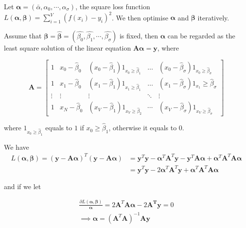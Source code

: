 Let $\boldsymbol{\alpha}=(\bar{\alpha},\alpha_0,\cdots,\alpha_\sigma)$, the square loss function $L(\boldsymbol{\alpha},\boldsymbol{\beta})=\sum_{i=1}^{V}(f(x_i)-y_i)^2$. We then optimise $\boldsymbol{\alpha}$ and $\boldsymbol{\beta}$ iteratively.

Assume that $\boldsymbol{\beta}=\hat{\boldsymbol{\beta}}=(\hat{\beta_0},\hat{\beta_1},\cdots,\hat{\beta_\sigma})$ is fixed, then $\boldsymbol{\alpha}$ can be regarded as the least square solution of the linear equation $\boldsymbol{A\alpha}=\boldsymbol{y}$, where

$$
\boldsymbol{A}=\left[\begin{array}{ccccc}
1 & x_{0}-\hat{\beta}_{0} & \left(x_{0}-\hat{\beta}_{1}\right) 1_{x_{0} \geq \hat{\beta}_{1}} & \ldots & \left(x_{0}-\hat{\beta}_{\sigma}\right) 1_{x_{0} \geq \hat{\beta}_{\sigma}} \\
1 & x_{1}-\hat{\beta}_{0} & \left(x_{1}-\hat{\beta}_{1}\right) 1_{x_{1} \geq \hat{\beta}_{1}} & \ldots & \left(x_{1}-\hat{\beta}_{\sigma}\right) 1_{x_{1}} \geq \hat{\beta}_{\sigma} \\
\vdots & \vdots & \vdots & \ddots & \vdots \\
1 & x_{N}-\hat{\beta}_{0} & \left(x_{V}-\hat{\beta}_{1}\right) 1_{x_{V} \geq \hat{\beta}_{2}} & \cdots & \left(x_{V}-\hat{\beta}_{\sigma}\right) 1_{x_{V} \geq \hat{\beta}_{\sigma}}
\end{array}\right]$$

where $1_{x_{0} \geq \hat{\beta}_{1}}$ equals to $1$ if ${x_{0} \geq \hat{\beta}_{1}}$, otherwise it equals to $0$.

We have
\begin{equation}
 \begin{split}
	L(\boldsymbol{\alpha},\boldsymbol{\beta}) 
	 =(\boldsymbol{y-A\alpha})^T(\boldsymbol{y-A\alpha}) 
	&=\boldsymbol{y}^T\boldsymbol{y}-\boldsymbol{\alpha}{^T}\boldsymbol{A}^T\boldsymbol{y}-\boldsymbol{y}^T\boldsymbol{A\alpha}+\boldsymbol{\alpha}^T\boldsymbol{A}^T\boldsymbol{A\alpha} \\
	& = \boldsymbol{y}^T\boldsymbol{y}-2\boldsymbol{\alpha}^T\boldsymbol{A}^T\boldsymbol{y}+\boldsymbol{\alpha}^T\boldsymbol{A}^T\boldsymbol{A}\boldsymbol{\alpha}
\end{split}
\end{equation}

and if we let 

\begin{equation}
\label{alpha_form}
	\begin{split}
		\frac{\partial L(\boldsymbol{\alpha}, \boldsymbol{\beta})}{\boldsymbol{\alpha}}=2\boldsymbol{A}^T\boldsymbol{A}\boldsymbol{\alpha}-2\boldsymbol{A^T}\boldsymbol{y}=0 \\ \implies 
		\boldsymbol{\alpha}=(\boldsymbol{A}^T\boldsymbol{A})^{-1}\boldsymbol{A}\boldsymbol{y}
	\end{split}
\end{equation}


